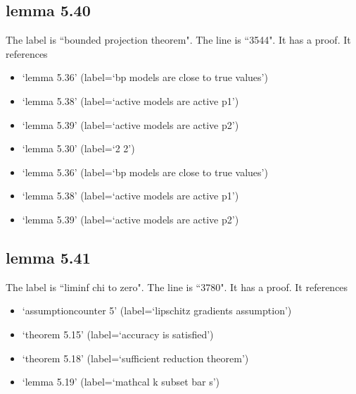 \documentclass{article}
\begin{document}
\subsection{lemma 5.40}
The label is ``bounded projection theorem".
The line is ``3544".
It has a proof.
It references \begin{itemize}
\item `lemma 5.36' (label=`bp models are close to true values')
\item `lemma 5.38' (label=`active models are active p1')
\item `lemma 5.39' (label=`active models are active p2')
\item `lemma 5.30' (label=`2 2')
\item `lemma 5.36' (label=`bp models are close to true values')
\item `lemma 5.38' (label=`active models are active p1')
\item `lemma 5.39' (label=`active models are active p2')
\end{itemize}
\subsection{lemma 5.41}
The label is ``liminf chi to zero".
The line is ``3780".
It has a proof.
It references \begin{itemize}
\item `assumptioncounter 5' (label=`lipschitz gradients assumption')
\item `theorem 5.15' (label=`accuracy is satisfied')
\item `theorem 5.18' (label=`sufficient reduction theorem')
\item `lemma 5.19' (label=`mathcal k subset bar s')
\end{itemize}
\end{document}
